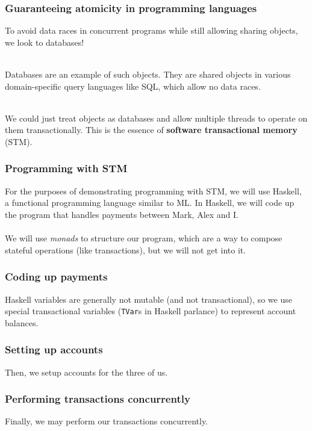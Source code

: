 \documentclass{beamer}
\theoremstyle{plain}
\begin{document}
\begin{frame}
  \frametitle{Guaranteeing atomicity in programming languages}
  To avoid data races in concurrent programs while still allowing sharing objects, we look to databases!\\~\\

  \pause

  Databases are an example of such objects. They are shared objects in various domain-specific query languages
  like SQL, which allow no data races.\\~\\

  \pause

  We could just treat objects as databases and allow multiple threads to operate on them transactionally. This
  is the essence of \textbf{software transactional memory} (STM).
\end{frame}

\begin{frame}
  \frametitle{Programming with STM}
  For the purposes of demonstrating programming with STM, we will use Haskell, a functional programming language
  similar to ML. In Haskell, we will code up the program that handles payments between Mark, Alex and I.\\~\\

  We will use \textit{monads} to structure our program, which are a way to compose stateful operations
  (like transactions), but we will not get into it.
\end{frame}

\begin{frame}[fragile]
  \frametitle{Coding up payments}
  Haskell variables are generally not mutable (and not transactional), so we use special transactional variables
  (\lstinline{TVar}s in Haskell parlance) to represent account balances.

  
\end{frame}

\begin{frame}[fragile]
  \frametitle{Setting up accounts}
  Then, we setup accounts for the three of us.
  
\end{frame}

\begin{frame}[fragile]
  \frametitle{Performing transactions concurrently}
  Finally, we may perform our transactions concurrently. 
  
\end{frame}
\end{document}
